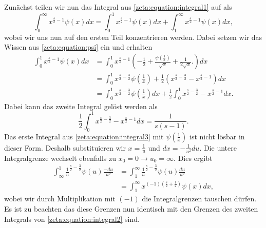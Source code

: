 Zunächst teilen wir nun das Integral aus \eqref{zeta:equation:integral1} auf als
\begin{equation}\label{zeta:equation:integral2}
    \int_0^{\infty}
    x^{\frac{s}{2}-1}
    \psi(x)
    dx
    =
    \int_0^{1}
    x^{\frac{s}{2}-1}
    \psi(x)
    dx
    +
    \int_1^{\infty}
    x^{\frac{s}{2}-1}
    \psi(x)
    dx,
\end{equation}
wobei wir uns nun auf den ersten Teil konzentrieren werden.
Dabei setzen wir das Wissen aus \eqref{zeta:equation:psi} ein und erhalten
\begin{align}
    \int_0^{1}
    x^{\frac{s}{2}-1}
    \psi(x)
    dx
    &=
    \int_0^{1}
    x^{\frac{s}{2}-1}
    \left(
    - \frac{1}{2}
    + \frac{\psi\left(\frac{1}{x} \right)}{\sqrt{x}}
    + \frac{1}{2 \sqrt{x}}.
    \right)
    dx
    \\
    &=
    \int_0^{1}
    x^{\frac{s}{2}-\frac{3}{2}}
    \psi \left( \frac{1}{x} \right)
    + \frac{1}{2}
    \left(
    x^{\frac{s}{2}-\frac{3}{2}}
    -
    x^{\frac{s}{2}-1}
    \right)
    dx
    \\
    &=
    \int_0^{1}
    x^{\frac{s}{2}-\frac{3}{2}}
    \psi \left( \frac{1}{x} \right)
    dx
    + \frac{1}{2}
    \int_0^1
    x^{\frac{s}{2}-\frac{3}{2}}
    -
    x^{\frac{s}{2}-1}
    dx. \label{zeta:equation:integral3}
\end{align}
Dabei kann das zweite Integral gelöst werden als
\begin{equation}
    \frac{1}{2}
    \int_0^1
    x^{\frac{s}{2}-\frac{3}{2}}
    -
    x^{\frac{s}{2}-1}
    dx
    =
    \frac{1}{s(s-1)}.
\end{equation}
Das erste Integral aus \eqref{zeta:equation:integral3} mit $\psi \left(\frac{1}{x} \right)$ ist nicht lösbar in dieser Form.
Deshalb substituieren wir $x = \frac{1}{u}$ und $dx = -\frac{1}{u^2}du$.
Die untere Integralgrenze wechselt ebenfalls zu $x_0 = 0 \rightarrow u_0 = \infty$.
Dies ergibt
\begin{align}
    \int_{\infty}^{1}
    {\frac{1}{u}}^{\frac{s}{2}-\frac{3}{2}}
    \psi(u)
    \frac{-du}{u^2}
    &=
    \int_{1}^{\infty}
    {\frac{1}{u}}^{\frac{s}{2}-\frac{3}{2}}
    \psi(u)
    \frac{du}{u^2}
    \\
    &=
    \int_{1}^{\infty}
    x^{(-1) \left(\frac{s}{2}+\frac{1}{2}\right)}
    \psi(x)
    dx,
\end{align}
wobei wir durch Multiplikation mit $(-1)$ die Integralgrenzen tauschen dürfen.
Es ist zu beachten das diese Grenzen nun identisch mit den Grenzen des zweiten Integrals von \eqref{zeta:equation:integral2} sind.
